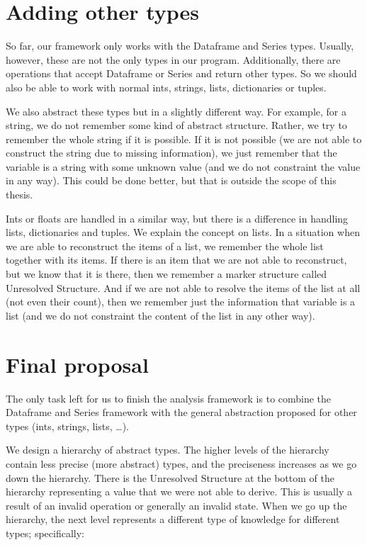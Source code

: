 \section{Adding other types}

So far, our framework only works with the Dataframe and Series types.
Usually, however, these are not the only types in our program.
Additionally, there are operations that accept Dataframe or Series and return other types.
So we should also be able to work with normal ints, strings, lists, dictionaries or tuples.

We also abstract these types but in a slightly different way.
For example, for a string, we do not remember some kind of abstract structure.
Rather, we try to remember the whole string if it is possible.
If it is not possible (we are not able to construct the string due to missing information), we just remember that the
variable is a string with some unknown value (and we do not constraint the value in any way).
This could be done better, but that is outside the scope of this thesis.

Ints or floats are handled in a similar way, but there is a difference in handling lists, dictionaries and tuples.
We explain the concept on lists.
In a situation when we are able to reconstruct the items of a list, we remember the whole list together with its items.
If there is an item that we are not able to reconstruct, but we know that it is there, then we remember a marker
structure called Unresolved Structure.
And if we are not able to resolve the items of the list at all (not even their count), then we remember just the
information that variable is a list (and we do not constraint the content of the list in any other way).


\section{Final proposal}

The only task left for us to finish the analysis framework is to combine the Dataframe and Series framework
with the general abstraction proposed for other types (ints, strings, lists, \ldots).

We design a hierarchy of abstract types.
The higher levels of the hierarchy contain less precise (more abstract) types, and the preciseness increases as we go
down the hierarchy.
There is the Unresolved Structure at the bottom of the hierarchy representing a value that we were not able to derive.
This is usually a result of an invalid operation or generally an invalid state.
When we go up the hierarchy, the next level represents a different type of knowledge for different types; specifically:

